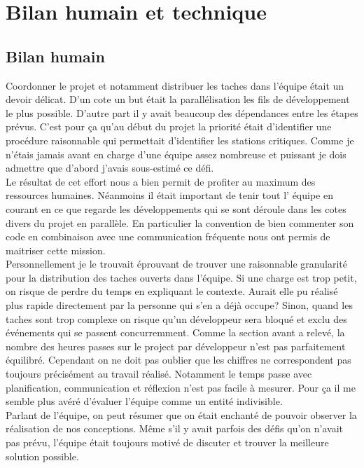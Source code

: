 \documentclass[10pt,a4paper]{book}
\begin{document}
\section{Bilan humain et technique}
\subsection{Bilan humain}
Coordonner le projet et notamment distribuer les taches dans l'équipe était un devoir délicat. D'un cote un but était la parallélisation les fils de développement le plus possible. D'autre part il y avait beaucoup des dépendances entre les étapes prévus. C'est pour ça qu'au début du projet la priorité était d'identifier une procédure raisonnable qui permettait d'identifier les stations critiques. Comme je n'étais jamais avant en charge d'une équipe assez nombreuse et puissant je dois admettre que d'abord j'avais sous-estimé ce défi.\\ Le résultat de cet effort nous a bien permit de profiter au maximum des ressources humaines. Néanmoins il était important de tenir tout l' équipe en courant en ce que regarde les développements qui se sont déroule dans les cotes divers du projet en parallèle. En particulier la convention de bien commenter son code en combinaison avec une communication fréquente nous ont permis de maitriser cette mission.\\Personnellement je le trouvait éprouvant de trouver une raisonnable granularité pour la distribution des taches ouverts dans l'équipe. Si une charge est trop petit, on risque de perdre du temps en expliquant le contexte. Aurait elle pu réalisé plus rapide directement par la personne qui s'en a déjà occupe? Sinon, quand les taches sont trop complexe on risque qu'un développeur sera bloqué et exclu des événements qui se passent concurremment. Comme la section avant a relevé, la nombre des heures passes sur le project par développeur n'est pas parfaitement équilibré. Cependant on ne doit pas oublier que les chiffres ne correspondent pas toujours précisément au travail réalisé. Notamment le temps passe avec planification, communication et réflexion n'est pas facile à mesurer. Pour ça il me semble plus avéré d'évaluer l'équipe comme un entité indivisible.\\
Parlant de l'équipe, on peut résumer que on était enchanté de pouvoir observer la réalisation de nos conceptions. Même s'il y avait parfois des défis qu'on n'avait pas prévu, l'équipe était toujours motivé de discuter et trouver la meilleure solution possible.
\end{document}
